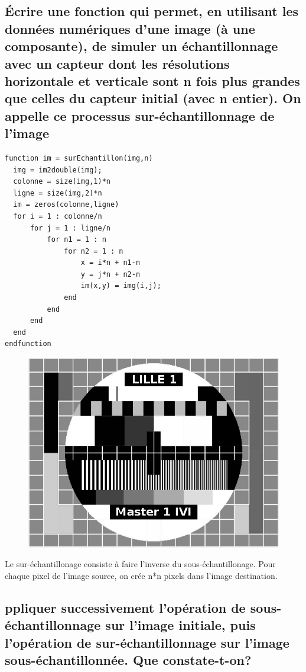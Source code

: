\documentclass[a4paper,12pt]{report}
\begin{document}
\subsection*{Écrire une fonction qui permet, en utilisant les données numériques d'une image (à une composante), de simuler un échantillonnage avec un capteur dont les résolutions horizontale et verticale sont n fois plus grandes que celles du capteur initial (avec n entier). On appelle ce processus sur-échantillonnage de l'image}

\begin{lstlisting}
function im = surEchantillon(img,n)
  img = im2double(img);
  colonne = size(img,1)*n
  ligne = size(img,2)*n
  im = zeros(colonne,ligne)
  for i = 1 : colonne/n
      for j = 1 : ligne/n
          for n1 = 1 : n
              for n2 = 1 : n
                  x = i*n + n1-n
                  y = j*n + n2-n
                  im(x,y) = img(i,j);
              end
          end
      end
  end
endfunction
\end{lstlisting}

\begin{figure}[!ht]
	\center
	\includegraphics[scale=0.6]{image/p23.png}
\end{figure}

\noindent Le sur-échantillonage consiste à faire l'inverse du sous-échantillonage. Pour chaque pixel de l'image source, on crée n*n pixels dans l'image destination.

\subsection*{ppliquer successivement l'opération de sous-échantillonnage sur l'image initiale, puis l'opération de sur-échantillonnage sur l'image sous-échantillonnée. Que constate-t-on?}
\end{document}

